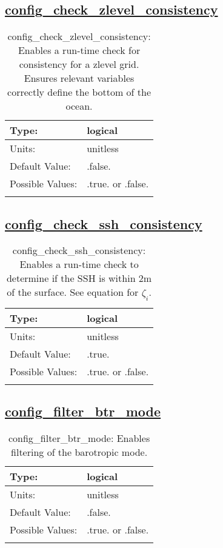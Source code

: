 \subsection[config\_check\_zlevel\_consistency]{\hyperref[sec:nm_tab_debug]{config\_check\_zlevel\_consistency}}
\label{subsec:nm_sec_config_check_zlevel_consistency}
\begin{center}
\begin{longtable}{| p{2.0in} || p{4.0in} |}
    \hline
    Type: & logical \\
    \hline
    Units: & \si{unitless} \\
    \hline
    Default Value: & .false. \\
    \hline
    Possible Values: & .true. or .false. \\
    \hline
    \caption{config\_check\_zlevel\_consistency: Enables a run-time check for consistency for a zlevel grid. Ensures relevant variables correctly define the bottom of the ocean.}
\end{longtable}
\end{center}
\subsection[config\_check\_ssh\_consistency]{\hyperref[sec:nm_tab_debug]{config\_check\_ssh\_consistency}}
\label{subsec:nm_sec_config_check_ssh_consistency}
\begin{center}
\begin{longtable}{| p{2.0in} || p{4.0in} |}
    \hline
    Type: & logical \\
    \hline
    Units: & \si{unitless} \\
    \hline
    Default Value: & .true. \\
    \hline
    Possible Values: & .true. or .false. \\
    \hline
    \caption{config\_check\_ssh\_consistency: Enables a run-time check to determine if the SSH is within 2m of the surface.  See equation for $\zeta_i$.}
\end{longtable}
\end{center}
\subsection[config\_filter\_btr\_mode]{\hyperref[sec:nm_tab_debug]{config\_filter\_btr\_mode}}
\label{subsec:nm_sec_config_filter_btr_mode}
\begin{center}
\begin{longtable}{| p{2.0in} || p{4.0in} |}
    \hline
    Type: & logical \\
    \hline
    Units: & \si{unitless} \\
    \hline
    Default Value: & .false. \\
    \hline
    Possible Values: & .true. or .false. \\
    \hline
    \caption{config\_filter\_btr\_mode: Enables filtering of the barotropic mode.}
\end{longtable}
\end{center}
